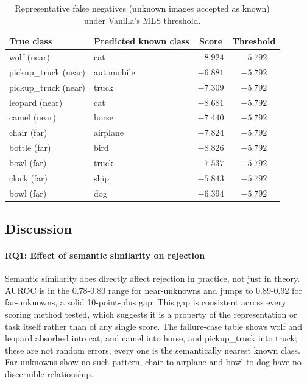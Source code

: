 \documentclass{article}
\begin{document}
\begin{table}[t]
  \caption{Representative false negatives (unknown images accepted as known) under Vanilla's MLS threshold.}
  \label{tab:t4-failures}
  \centering
  \footnotesize
  \begin{tabular}{llcc}
    \toprule
    True class & Predicted known class & Score & Threshold \\
    \midrule
    wolf (near)         & cat        & $-8.924$ & $-5.792$ \\
    pickup\_truck (near) & automobile & $-6.881$ & $-5.792$ \\
    pickup\_truck (near) & truck      & $-7.309$ & $-5.792$ \\
    leopard (near)      & cat        & $-8.681$ & $-5.792$ \\
    camel (near)        & horse      & $-7.440$ & $-5.792$ \\
    chair (far)         & airplane   & $-7.824$ & $-5.792$ \\
    bottle (far)        & bird       & $-8.826$ & $-5.792$ \\
    bowl (far)          & truck      & $-7.537$ & $-5.792$ \\
    clock (far)         & ship       & $-5.843$ & $-5.792$ \\
    bowl (far)          & dog        & $-6.394$ & $-5.792$ \\
    \bottomrule
  \end{tabular}
\end{table}

\subsection{Discussion}

\paragraph{RQ1: Effect of semantic similarity on rejection}

Semantic similarity does directly affect rejection in practice, not just in theory. AUROC is in the 0.78-0.80 range for near-unknowns and jumps to 0.89-0.92 for far-unknowns, a solid 10-point-plus gap. This gap is consistent across every scoring method tested, which suggests it is a property of the representation or task itself rather than of any single score. The failure-case table shows wolf and leopard absorbed into cat, and camel into horse, and pickup\_truck into truck; these are not random errors, every one is the semantically nearest known class. Far-unknowns show no such pattern, chair to airplane and bowl to dog have no discernible relationship.
\end{document}
